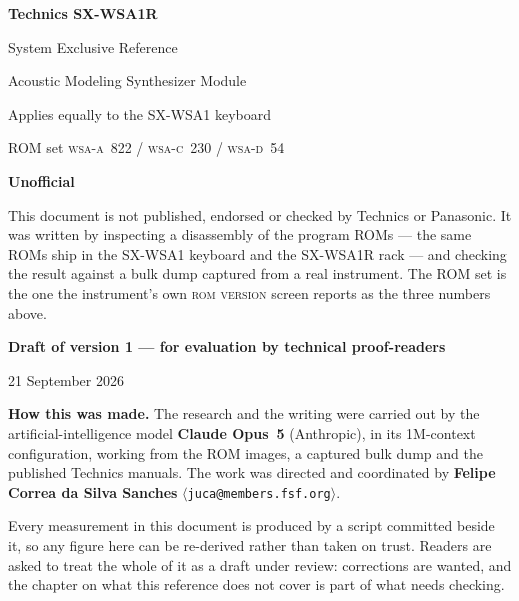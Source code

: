 


\begin{titlepage}
\centering
\vspace*{3cm}
{\Huge\bfseries Technics SX-WSA1R\par}
\vspace{6mm}
{\LARGE System Exclusive Reference\par}
\vspace{18mm}
{\large Acoustic Modeling Synthesizer Module\par}
\vspace{4mm}
{\large Applies equally to the SX-WSA1 keyboard\par}
\vspace{2mm}
{\large ROM set \textsc{wsa-a}~822 / \textsc{wsa-c}~230 / \textsc{wsa-d}~54\par}
\vspace{20mm}
{\Large\bfseries Unofficial\par}
\vspace{6mm}
\begin{minipage}{0.78\textwidth}
\centering
\normalsize
This document is not published, endorsed or checked by Technics or Panasonic.
It was written by inspecting a disassembly of the program ROMs --- the same
ROMs ship in the SX-WSA1 keyboard and the SX-WSA1R rack --- and checking the
result against a bulk dump captured from a real instrument. The ROM set is the
one the instrument's own \textsc{rom version} screen reports as the three
numbers above.
\end{minipage}

\vspace{12mm}
{\large\bfseries Draft of version 1 --- for evaluation by technical proof-readers\par}
\vspace{4mm}
{\large 21 September 2026\par}

\vspace{14mm}
\begin{minipage}{0.78\textwidth}
\centering
\normalsize
\textbf{How this was made.} The research and the writing were carried out by the
artificial-intelligence model \textbf{Claude Opus~5} (Anthropic), in its 1M-context configuration, working from the ROM
images, a captured bulk dump and the published Technics manuals. The work was directed and
coordinated by \textbf{Felipe Correa da Silva Sanches}
$\langle$\texttt{juca@members.fsf.org}$\rangle$.

Every measurement in this document is produced by a script committed beside it, so any
figure here can be re-derived rather than taken on trust. Readers are asked to treat the
whole of it as a draft under review: corrections are wanted, and the chapter on what this
reference does not cover is part of what needs checking.
\end{minipage}
\vfill
\end{titlepage}


